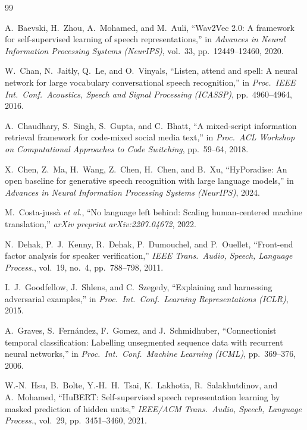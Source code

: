 \documentclass[10pt,twocolumn]{article}
\begin{document}

\begin{thebibliography}{99}

A.~Baevski, H.~Zhou, A.~Mohamed, and M.~Auli,
``Wav2Vec 2.0: A framework for self-supervised learning of speech representations,''
in \emph{Advances in Neural Information Processing Systems (NeurIPS)}, vol.~33, pp.~12449--12460, 2020.

W.~Chan, N.~Jaitly, Q.~Le, and O.~Vinyals,
``Listen, attend and spell: A neural network for large vocabulary conversational speech recognition,''
in \emph{Proc.\ IEEE Int.\ Conf.\ Acoustics, Speech and Signal Processing (ICASSP)}, pp.~4960--4964, 2016.

A.~Chaudhary, S.~Singh, S.~Gupta, and C.~Bhatt,
``A mixed-script information retrieval framework for code-mixed social media text,''
in \emph{Proc.\ ACL Workshop on Computational Approaches to Code Switching}, pp.~59--64, 2018.

X.~Chen, Z.~Ma, H.~Wang, Z.~Chen, H.~Chen, and B.~Xu,
``HyPoradise: An open baseline for generative speech recognition with large language models,''
in \emph{Advances in Neural Information Processing Systems (NeurIPS)}, 2024.

M.~Costa-juss\`{a} \emph{et al.},
``No language left behind: Scaling human-centered machine translation,''
\emph{arXiv preprint arXiv:2207.04672}, 2022.

N.~Dehak, P.~J.~Kenny, R.~Dehak, P.~Dumouchel, and P.~Ouellet,
``Front-end factor analysis for speaker verification,''
\emph{IEEE Trans.\ Audio, Speech, Language Process.}, vol.~19, no.~4, pp.~788--798, 2011.

I.~J.~Goodfellow, J.~Shlens, and C.~Szegedy,
``Explaining and harnessing adversarial examples,''
in \emph{Proc.\ Int.\ Conf.\ Learning Representations (ICLR)}, 2015.

A.~Graves, S.~Fern\'{a}ndez, F.~Gomez, and J.~Schmidhuber,
``Connectionist temporal classification: Labelling unsegmented sequence data with recurrent neural networks,''
in \emph{Proc.\ Int.\ Conf.\ Machine Learning (ICML)}, pp.~369--376, 2006.

W.-N.~Hsu, B.~Bolte, Y.-H.~H.~Tsai, K.~Lakhotia, R.~Salakhutdinov, and A.~Mohamed,
``HuBERT: Self-supervised speech representation learning by masked prediction of hidden units,''
\emph{IEEE/ACM Trans.\ Audio, Speech, Language Process.}, vol.~29, pp.~3451--3460, 2021.


\end{thebibliography}
\end{document}
